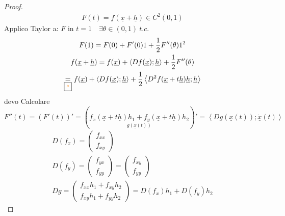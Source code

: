 \documentclass[a4paper, oneside]{article}
\begin{document}
        \begin{proof}
            \hfil\\
            \begin{gather*}
                F(t) = f(\underline{x} + \underline{h}) \in C^2(0,1)
            \end{gather*}
            Applico Taylor a: $F$ in $t=1 \quad \exists \theta \in (0,1) \ t.c.$\\
            \begin{gather*}
                F(1) = F(0) + F'(0) 1 + \frac{1}{2} F''(\theta)1^2\\
                f(\underline{x} + \underline{h}) = f(\underline{x}) + \left\langle Df(\underline{x});\underline{h} \right\rangle + \frac{1}{2}F''(\theta)\\
                \underset{\text{\fbox{\textcolor{orange}{*}}}}{=}  f(\underline{x}) + \left\langle Df(\underline{x});\underline{h} \right\rangle + \frac{1}{2}\left\langle D^2f(\underline{x} + t \underline{h})\underline{h} ; \underline{h}\right\rangle
            \end{gather*}
            devo Calcolare $F''(t) = (F'(t))' = (\underset{g(\underline{x}(t))}{f_x(\underline{x}+ t \underline{h})h_1+f_y(\underline{x} + t\underline{h})h_2})' = \left\langle Dg(\underline{x}(t)); \dot{\underline{x}}(t) \right\rangle $\\
            \begin{gather*}
                D(f_x) = \begin{pmatrix}
                    f_{xx}\\
                    f_{xy}
                \end{pmatrix}\\
                D(f_y) = \begin{pmatrix}
                    f_{yx}\\
                    f_{yy}
                \end{pmatrix} = \begin{pmatrix}
                    f_{xy}\\
                    f_{yy}
                \end{pmatrix}\\
                Dg = \begin{pmatrix}
                    f_{xx} h_1+ f_{xy}h_2\\
                    f_{xy} h_1 + f_{yy}h_2
                \end{pmatrix}
                = D(f_x)h_1 + D(f_y)h_2

\end{gather*}
\end{proof}
\end{document}
